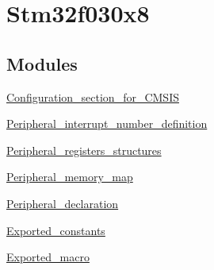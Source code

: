 \hypertarget{group__stm32f030x8}{}\section{Stm32f030x8}
\label{group__stm32f030x8}
\subsection*{Modules}
\begin{DoxyCompactItemize}
\item 
\hyperlink{group___configuration__section__for___c_m_s_i_s}{Configuration\+\_\+section\+\_\+for\+\_\+\+C\+M\+S\+IS}
\item 
\hyperlink{group___peripheral__interrupt__number__definition}{Peripheral\+\_\+interrupt\+\_\+number\+\_\+definition}
\item 
\hyperlink{group___peripheral__registers__structures}{Peripheral\+\_\+registers\+\_\+structures}
\item 
\hyperlink{group___peripheral__memory__map}{Peripheral\+\_\+memory\+\_\+map}
\item 
\hyperlink{group___peripheral__declaration}{Peripheral\+\_\+declaration}
\item 
\hyperlink{group___exported__constants}{Exported\+\_\+constants}
\item 
\hyperlink{group___exported__macro}{Exported\+\_\+macro}
\end{DoxyCompactItemize}
